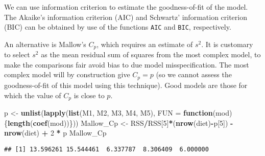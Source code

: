 \documentclass[]{book}
\newenvironment{Shaded}{\begin{snugshade}}{\end{snugshade}}
\newcommand{\CommentTok}[1]{\textcolor[rgb]{0.56,0.35,0.01}{\textit{#1}}}
\newcommand{\ControlFlowTok}[1]{\textcolor[rgb]{0.13,0.29,0.53}{\textbf{#1}}}
\newcommand{\DataTypeTok}[1]{\textcolor[rgb]{0.13,0.29,0.53}{#1}}
\newcommand{\DecValTok}[1]{\textcolor[rgb]{0.00,0.00,0.81}{#1}}
\newcommand{\KeywordTok}[1]{\textcolor[rgb]{0.13,0.29,0.53}{\textbf{#1}}}
\newcommand{\NormalTok}[1]{#1}
\newcommand{\OperatorTok}[1]{\textcolor[rgb]{0.81,0.36,0.00}{\textbf{#1}}}
\newcommand{\StringTok}[1]{\textcolor[rgb]{0.31,0.60,0.02}{#1}}
\theoremstyle{definition}
\theoremstyle{definition}
\theoremstyle{definition}
\theoremstyle{remark}
\begin{document}
We can use information criterion to estimate the goodness-of-fit of the
model. The Akaike's information criterion (AIC) and Schwartz'
information criterion (BIC) can be obtained by use of the functions
\texttt{AIC} and \texttt{BIC}, respectively.

An alternative is Mallow's \(C_p\), which requires an estimate of
\(s^2\). It is customary to select \(s^2\) as the mean residual sum of
squares from the most complex model, to make the comparisons fair avoid
bias to due model misspecification. The most complex model will by
construction give \(C_p=p\) (so we cannot assess the goodness-of-fit of
this model using this technique). Good models are those for which the
value of \(C_p\) is close to \(p\).

\begin{Shaded}
\begin{Highlighting}[]
\NormalTok{p <-}\StringTok{ }\KeywordTok{unlist}\NormalTok{(}\KeywordTok{lapply}\NormalTok{(}\KeywordTok{list}\NormalTok{(M1, M2, M3, M4, M5), }
                   \DataTypeTok{FUN =} \ControlFlowTok{function}\NormalTok{(mod)\{}\KeywordTok{length}\NormalTok{(}\KeywordTok{coef}\NormalTok{(mod))\}))}
\NormalTok{Mallow_Cp <-}\StringTok{ }\NormalTok{RSS}\OperatorTok{/}\NormalTok{RSS[}\DecValTok{5}\NormalTok{]}\OperatorTok{*}\NormalTok{(}\KeywordTok{nrow}\NormalTok{(diet)}\OperatorTok{-}\NormalTok{p[}\DecValTok{5}\NormalTok{]) }\OperatorTok{-}\StringTok{ }\KeywordTok{nrow}\NormalTok{(diet) }\OperatorTok{+}\StringTok{ }\DecValTok{2} \OperatorTok{*}\StringTok{ }\NormalTok{p}
\NormalTok{Mallow_Cp}
\end{Highlighting}
\end{Shaded}

\begin{verbatim}
## [1] 13.596261 15.544461  6.337787  8.306409  6.000000
\end{verbatim}

\begin{Shaded}
\end{Shaded}
\end{document}
